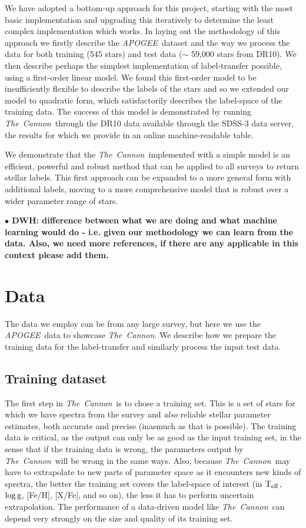 \documentclass[12pt, preprint]{aastex}
\newcommand{\teff}{\mbox{$\rm T_{eff}$}}
\newcommand{\logg}{\mbox{$\rm \log g$}}
\newcommand{\tc}{\textsl{The~Cannon}}
\newcommand{\apogee}{\textsl{APOGEE}}
\begin{document}
We have adopted a bottom-up approach for this project, starting with the most basic implementation and upgrading this iteratively to determine the least complex implementation which works.  In laying out the methodology of this approach we firstly describe the \apogee\ dataset and the way we process the data for both training (545 stars) and test data ($\sim$ 59,000 stars from DR10). We then describe perhaps the simplest implementation of label-transfer possible, using a first-order linear model. We found this first-order model to be insufficiently flexible to describe the labels of the stars and so we extended our model to quadratic form, which satisfactorily describes the label-space of the training data. The success of this model is demonstrated by running \tc\ through the DR10 data available through the SDSS-3 data server, the results for which we provide in an online machine-readable table. %

We demonstrate that the \tc\ implemented with a simple model is an efficient, powerful and robust method that can be applied to all surveys to return stellar labels. This first approach can be expanded to a more general form with additional labels, moving to a more comprehensive model that is robust over a wider parameter range of stars. 

\textbf{$\bullet$ DWH: difference between what we are doing and what machine learning would do - i.e. given our methodology we can learn from the data. Also, we need more references, if there are any applicable in this context please add them.}


\section{Data}

The data we employ can be from any large survey, but here we use the \apogee\ data to showcase \tc . We describe how we prepare the training data for the label-transfer and similarly process the input test data.

\subsection{Training dataset}

The first step in \tc\ is to chose a training set. This is a set of stars for which we have spectra from the survey and
\emph{also} reliable stellar parameter estimates, both accurate and
precise (inasmuch as that is possible).
The training data is critical, as the output can only be as good as
the input training set, in the sense that if the training data is
wrong, the parameters output by \tc\ will be wrong in the same ways.
Also, because \tc\ may have to extrapolate to new parts of parameter
space as it encounters new kinds of spectra, the better the training
set covers the label-space of interest (in \teff, \logg, [Fe/H],
[X/Fe], and so on), the less it has to perform uncertain
extrapolation.
The performance of a data-driven model like \tc\ can depend very
strongly on the size and quality of its training set.
\end{document}
